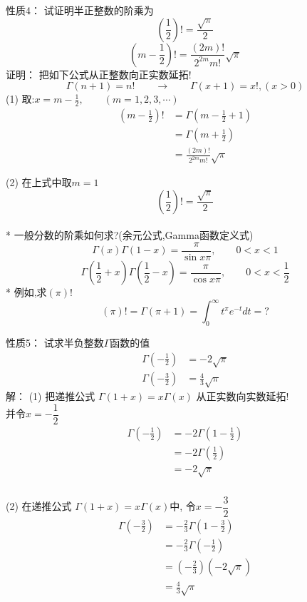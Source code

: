 \begin{frame}
	\alert{性质4：} 试证明半正整数的阶乘为
	\[(\frac{1}{2})! =  \frac{\sqrt{\pi}}{2}\]
	\[ (m-\frac{1}{2})! =\frac{(2m)!}{2^{2m} m!}\sqrt{\pi} \]
	\alert{证明：} 把如下公式从正整数向正实数延拓!
	\[\Gamma(n+1)=n!\qquad \to \qquad \Gamma(x+1)=x!, (x>0)\]
	(1) 取:$x=m-\frac{1}{2}, \qquad (m=1,2,3, \cdots )$
	\[ \begin{aligned}
		(m-\frac{1}{2})! &= \Gamma (m-\frac{1}{2}+1) \\
						 &= \Gamma (m+\frac{1}{2}) \\
						 & = \frac{(2m)!}{2^{2m} m!}\sqrt{\pi} 
	\end{aligned} \]
\end{frame}

\begin{frame}
	(2) 在上式中取$m=1$
	\[(\frac{1}{2})! =  \frac{\sqrt{\pi}}{2} \]
	~~ \\ \vspace{1em}
* 一般分数的阶乘如何求?(余元公式,Gamma函数定义式)
\[ \Gamma(x)  \Gamma(1-x) =\frac{\pi}{\sin x \pi}, \qquad  0<x<1 \]
\[ \Gamma(\frac{1}{2}+x)  \Gamma(\frac{1}{2}-x) =\frac{\pi}{\cos x \pi}, \qquad  0<x<\frac{1}{2} \]
 * 例如,求$(\pi) !$ 
 \[ (\pi)! = \Gamma(\pi +1 ) = \int_{0}^{\infty} t^{\pi} e^{-t} dt =? \]
\end{frame}

\begin{frame}
	\alert{性质5：} 试求半负整数$\Gamma$函数的值
	\begin{equation*}
		\begin{split}
		\Gamma(-\frac{1}{2}) &=-2\sqrt{\pi} \\ 
		\Gamma(-\frac{3}{2}) &=\frac{4}{3}\sqrt{\pi}
		\end{split}	
	\end{equation*}	
	\alert{解：} (1) 把递推公式 $\Gamma(1+x)=x \Gamma(x)$ 从正实数向实数延拓! \\
	并令$x=-\dfrac{1}{2}$\\
	\[
	\begin{aligned}
		 \Gamma(-\frac{1}{2})&= -2 \Gamma(1-\frac{1}{2})\\
		 &=-2 \Gamma(\frac{1}{2})\\
		 &=-2 \sqrt{\pi}
	\end{aligned}	
	\]
\end{frame}

\begin{frame}
	  \frametitle{}
	(2) 在递推公式 $\Gamma(1+x)=x \Gamma(x)$中, 令$x=-\dfrac{3}{2}$\\
	\[
	\begin{aligned}
		 \Gamma(-\frac{3}{2})&= -\frac{2}{3} \Gamma(1-\frac{3}{2})\\
		 &=-\frac{2}{3} \Gamma(-\frac{1}{2})\\
		 &=(-\frac{2}{3})(-2 \sqrt{\pi}) \\
		 &=\frac{4}{3}\sqrt{\pi} \\
	\end{aligned}	
	\] 
\end{frame}

